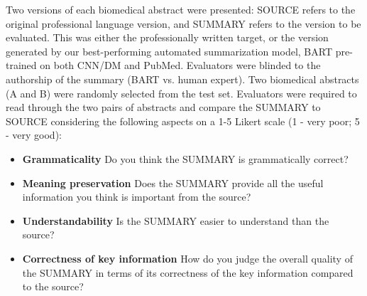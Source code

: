 \documentclass[letterpaper, table]{article} %
\begin{document}
Two versions of each biomedical abstract were presented: SOURCE refers to the original professional language version, and SUMMARY refers to the version to be evaluated. This was either the professionally written target, or the version generated by our best-performing automated summarization model, BART pre-trained on both CNN/DM and PubMed. Evaluators were blinded to the authorship of the summary (BART vs. human expert). Two biomedical abstracts (A and B) were randomly selected from the test set. Evaluators were required to read through the two pairs of abstracts and compare the SUMMARY to SOURCE considering the following aspects on a 1-5 Likert scale (1 - very poor; 5 - very good):
\begin{itemize}
    \item \textbf{Grammaticality} Do you think the SUMMARY is grammatically correct?
    \item \textbf{Meaning preservation} Does the SUMMARY provide all the useful information you think is important from the source?
    \item \textbf{Understandability} Is the SUMMARY easier to understand than the source?
    \item \textbf{Correctness of key information} How do you judge the overall quality of the SUMMARY in terms of its correctness of the key information compared to the source?
\end{itemize}
\end{document}

